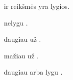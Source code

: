 \documentclass[letterpaper,10pt,lithuanian]{sphinxmanual}
\begin{document}
\begin{fulllineitems}

\pysigstartsignatures
{}
\pysigstopsignatures

\begin{fulllineitems}

\pysigstartsignatures
{}
\pysigstopsignatures
\sphinxAtStartPar
{} ir  reikšmės yra lygios.

\end{fulllineitems}



\begin{fulllineitems}

\pysigstartsignatures
{}
\pysigstopsignatures
\sphinxAtStartPar
{} nelygu .

\end{fulllineitems}



\begin{fulllineitems}

\pysigstartsignatures
{}
\pysigstopsignatures
\sphinxAtStartPar
{} daugiau už .

\end{fulllineitems}



\begin{fulllineitems}

\pysigstartsignatures
{}
\pysigstopsignatures
\sphinxAtStartPar
{} mažiau už .

\end{fulllineitems}



\begin{fulllineitems}

\pysigstartsignatures
{}
\pysigstopsignatures
\sphinxAtStartPar
{} daugiau arba lygu .

\end{fulllineitems}




\end{fulllineitems}
\end{document}
